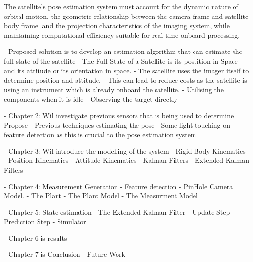 The satellite's pose estimation system must account for the dynamic nature of orbital motion, 
the geometric relationship between the camera frame and satellite body frame, and the projection 
characteristics of the imaging system, while maintaining computational efficiency suitable for 
real-time onboard processing. 



\label{sec:description}

- Proposed solution is to develop an estimation algorithm that can estimate the full state of the satellite
- The Full State of a Satellite is its postition in Space and its attitude or its orientation in space.
- The satellite uses the imager itself to determine position and attitude.
- This can lead to reduce costs as the satellite is using an instrument which is already onboard the satellite.
- Utilising the components when it is idle
- Observing the target directly


\label{sec:outline}

- Chapter 2: Wil investigate previous sensors that is being used to determine Propose
- Previous techniques estimating the pose
- Some light touching on feature detection as this is crucial to the pose estimation system

- Chapter 3: Wil introduce the modelling of the system
- Rigid Body Kinematics
- Position Kinematics
- Attitude Kinematics
- Kalman Filters
- Extended Kalman Filters

- Chapter 4: Measurement Generation
- Feature detection
- PinHole Camera Model.
- The Plant
- The Plant Model
- The Measurment Model

- Chapter 5: State estimation
- The Extended Kalman Filter
- Update Step
- Prediction Step
- Simulator

- Chapter 6 is results

- Chapter 7 is Conclusion
- Future Work